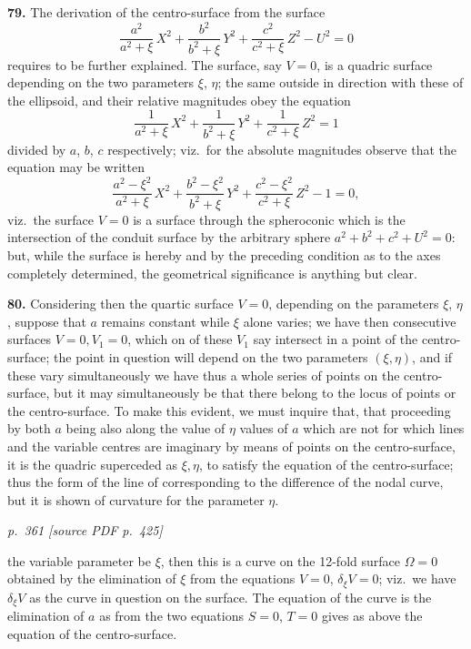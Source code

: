 \documentclass[11pt,a4paper]{article}
\newcommand{\pagemarker}[2]{\par\bigskip\noindent\textit{p.~#1 [source PDF p.~#2]}\par\smallskip}
\begin{document}
\textbf{79.} The derivation of the centro-surface from the surface
\[
\frac{a^2}{a^2 + \xi}\,X^2 + \frac{b^2}{b^2 + \xi}\,Y^2 + \frac{c^2}{c^2 + \xi}\,Z^2 - U^2 = 0
\]
requires to be further explained. The surface, say $V = 0$, is a quadric surface depending on the two parameters $\xi$, $\eta$; the same outside in direction with these of the ellipsoid, and their relative magnitudes obey the equation
\[
\frac{1}{a^2 + \xi}\,X^2 + \frac{1}{b^2 + \xi}\,Y^2 + \frac{1}{c^2 + \xi}\,Z^2 = 1
\]
divided by $a$, $b$, $c$ respectively; viz.\ for the absolute magnitudes observe that the equation may be written
\[
\frac{a^2 - \xi^2}{a^2 + \xi}\,X^2 + \frac{b^2 - \xi^2}{b^2 + \xi}\,Y^2 + \frac{c^2 - \xi^2}{c^2 + \xi}\,Z^2 - 1 = 0,
\]
viz.\ the surface $V = 0$ is a surface through the spheroconic which is the intersection of the conduit surface by the arbitrary sphere $a^2 + b^2 + c^2 + U^2 = 0$: but, while the surface is hereby and by the preceding condition as to the axes completely determined, the geometrical significance is anything but clear.

\textbf{80.} Considering then the quartic surface $V = 0$, depending on the parameters $\xi$, $\eta$, suppose that $a$ remains constant while $\xi$ alone varies; we have then consecutive surfaces $V = 0, V_1 = 0$, which on of these $V_1$ say intersect in a point of the centro-surface; the point in question will depend on the two parameters $(\xi, \eta)$, and if these vary simultaneously we have thus a whole series of points on the centro-surface, but it may simultaneously be that there belong to the locus of points or the centro-surface. To make this evident, we must inquire that, that proceeding by both $a$ being also along the value of $\eta$ values of $a$ which are not for which lines and the variable centres are imaginary by means of points on the centro-surface, it is the quadric superceded as $\xi, \eta$, to satisfy the equation of the centro-surface; thus the form of the line of corresponding to the difference of the nodal curve, but it is shown of curvature for the parameter $\eta$.

\clearpage

\bigskip
\pagemarker{361}{425}
\smallskip

the variable parameter be $\xi$, then this is a curve on the 12-fold surface $\Omega = 0$ obtained by the elimination of $\xi$ from the equations $V = 0$, $\delta_\xi V = 0$; viz.\ we have $\delta_\xi V$ as the curve in question on the surface. The equation of the curve is the elimination of $a$ as from the two equations $S = 0$, $T = 0$ gives as above the equation of the centro-surface.
\end{document}
